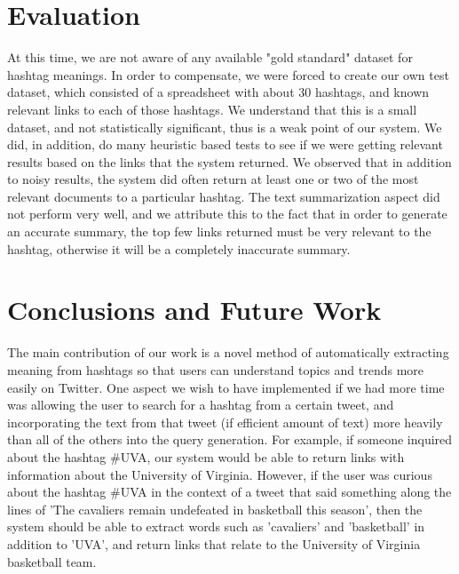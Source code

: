 \documentclass{sig-alternate}
\begin{document}
\section{Evaluation}
 At this time, we are not aware of any available "gold standard" dataset for hashtag meanings.  In order to compensate, we were forced to create our own test dataset, which consisted of a spreadsheet with about 30 hashtags, and known relevant links to each of those hashtags. We understand that this is a small dataset, and not statistically significant, thus is a weak point of our system. We did, in addition, do many heuristic based tests to see if we were getting relevant results based on the links that the system returned. We observed that in addition to noisy results, the system did often return at least one or two of the most relevant documents to a particular hashtag. The text summarization aspect did not perform very well, and we attribute this to the fact that in order to generate an accurate summary, the top few links returned must be very relevant to the hashtag, otherwise it will be a completely inaccurate summary.\\


\section{Conclusions and Future Work}
The main contribution of our work is a novel method of automatically extracting meaning from hashtags so that users can understand topics and trends more easily on Twitter. 
One aspect we wish to have implemented if we had more time was allowing the user to search for a hashtag from a certain tweet, and incorporating the text from that tweet (if efficient amount of text) more heavily than all of the others into the query generation. For example, if someone inquired about the hashtag \#UVA, our system would be able to return links with information about the University of Virginia. However, if the user was curious about the hashtag \#UVA in the context of a tweet that said something along the lines of 'The cavaliers remain undefeated in basketball this season', then the system should be able to extract words such as 'cavaliers' and 'basketball' in addition to 'UVA', and return links that relate to the University of Virginia basketball team. 



\end{document}
